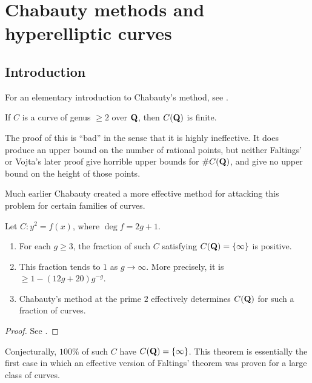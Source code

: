 
\section{Chabauty methods and hyperelliptic curves}\label{sec:poonen-iv}





\subsection{Introduction}

For an elementary introduction to Chabauty's method, see \cite{mp12}. 

\begin{theo}[Faltings, 1983]
If $C$ is a curve of genus $\geqslant 2$ over $\mathbf{Q}$, then $C(\mathbf{Q})$ is finite. 
\end{theo}

The proof of this is ``bad'' in the sense that it is highly ineffective. It 
does produce an upper bound on the number of rational points, but neither 
Faltings' or Vojta's later proof give horrible upper bounds for $\# C(\mathbf{Q})$, 
and give no upper bound on the height of those points. 

Much earlier Chabauty created a more effective method for attacking this 
problem for certain families of curves. 

\begin{theo}
Let $C:y^2=f(x)$, where $\deg f=2 g+1$. 
\begin{enumerate}
  \item For each $g\geqslant 3$, the fraction of such $C$ satisfying 
    $C(\mathbf{Q})=\{\infty\}$ is positive. 
  \item This fraction tends to $1$ as $g\to \infty$. More precisely, it is 
    $\geqslant 1-(12 g+20)g^{-g}$. 
  \item Chabauty's method at the prime $2$ effectively determines $C(\mathbf{Q})$ for 
    such a fraction of curves. 
\end{enumerate}
\end{theo}
\begin{proof}
See \cite{ps13}. 
\end{proof}

Conjecturally, $100\%$ of such $C$ have $C(\mathbf{Q})=\{\infty\}$. This theorem is 
essentially the first case in which an effective version of Faltings' theorem 
was proven for a large class of curves. 





